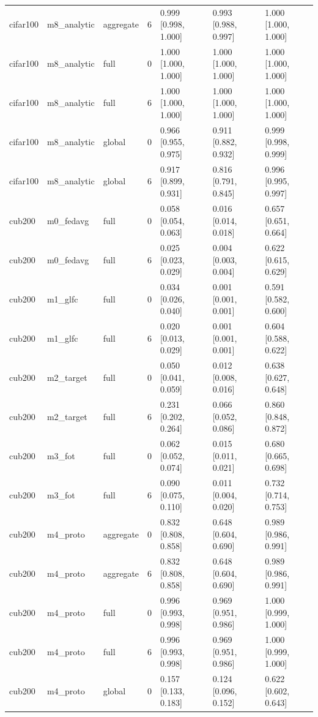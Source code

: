 \begin{tabular}{lllrlll}
cifar100 & m8\_analytic & aggregate & 6 & 0.999 [0.998, 1.000] & 0.993 [0.988, 0.997] & 1.000 [1.000, 1.000] \\
cifar100 & m8\_analytic & full & 0 & 1.000 [1.000, 1.000] & 1.000 [1.000, 1.000] & 1.000 [1.000, 1.000] \\
cifar100 & m8\_analytic & full & 6 & 1.000 [1.000, 1.000] & 1.000 [1.000, 1.000] & 1.000 [1.000, 1.000] \\
cifar100 & m8\_analytic & global & 0 & 0.966 [0.955, 0.975] & 0.911 [0.882, 0.932] & 0.999 [0.998, 0.999] \\
cifar100 & m8\_analytic & global & 6 & 0.917 [0.899, 0.931] & 0.816 [0.791, 0.845] & 0.996 [0.995, 0.997] \\
cub200 & m0\_fedavg & full & 0 & 0.058 [0.054, 0.063] & 0.016 [0.014, 0.018] & 0.657 [0.651, 0.664] \\
cub200 & m0\_fedavg & full & 6 & 0.025 [0.023, 0.029] & 0.004 [0.003, 0.004] & 0.622 [0.615, 0.629] \\
cub200 & m1\_glfc & full & 0 & 0.034 [0.026, 0.040] & 0.001 [0.001, 0.001] & 0.591 [0.582, 0.600] \\
cub200 & m1\_glfc & full & 6 & 0.020 [0.013, 0.029] & 0.001 [0.001, 0.001] & 0.604 [0.588, 0.622] \\
cub200 & m2\_target & full & 0 & 0.050 [0.041, 0.059] & 0.012 [0.008, 0.016] & 0.638 [0.627, 0.648] \\
cub200 & m2\_target & full & 6 & 0.231 [0.202, 0.264] & 0.066 [0.052, 0.086] & 0.860 [0.848, 0.872] \\
cub200 & m3\_fot & full & 0 & 0.062 [0.052, 0.074] & 0.015 [0.011, 0.021] & 0.680 [0.665, 0.698] \\
cub200 & m3\_fot & full & 6 & 0.090 [0.075, 0.110] & 0.011 [0.004, 0.020] & 0.732 [0.714, 0.753] \\
cub200 & m4\_proto & aggregate & 0 & 0.832 [0.808, 0.858] & 0.648 [0.604, 0.690] & 0.989 [0.986, 0.991] \\
cub200 & m4\_proto & aggregate & 6 & 0.832 [0.808, 0.858] & 0.648 [0.604, 0.690] & 0.989 [0.986, 0.991] \\
cub200 & m4\_proto & full & 0 & 0.996 [0.993, 0.998] & 0.969 [0.951, 0.986] & 1.000 [0.999, 1.000] \\
cub200 & m4\_proto & full & 6 & 0.996 [0.993, 0.998] & 0.969 [0.951, 0.986] & 1.000 [0.999, 1.000] \\
cub200 & m4\_proto & global & 0 & 0.157 [0.133, 0.183] & 0.124 [0.096, 0.152] & 0.622 [0.602, 0.643] \\

\end{tabular}
